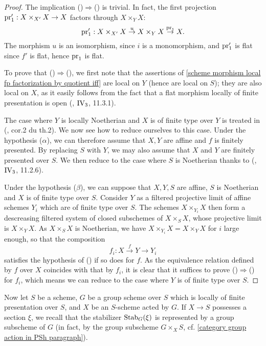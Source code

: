 \begin{proof}
The implication ()$\Rightarrow$() is trivial. In fact, the first projection $\mathrm{pr}_1':X\times_{X'}X\to X$ factors through $X\times_YX$:
\[\mathrm{pr}_1':X\times_{X'}X\stackrel{u}{\to} X\times_YX\stackrel{\mathrm{pr}_1}{\to} X.\]
The morphism $u$ is an isomorphism, since $i$ is a monomorphism, and $\mathrm{pr}_1'$ is flat since $f'$ is flat, hence $\mathrm{pr}_1$ is flat.\par
To prove that ()$\Rightarrow$(), we first note that the assertions of \cref{scheme morphism local fp factorization by quotient iff} are local on $Y$ (hence are local on $S$); they are also local on $X$, as it easily follows from the fact that a flat morphism locally of finite presentation is open (\cite{EGA4}, $\text{\Rmnum{4}}_3$, 11.3.1).\par
The case where $Y$ is locally Noetherian and $X$ is of finite type over $Y$ is treated in (\cite{Murre1964}, cor.2 du th.2). We now see how to reduce ourselves to this case. Under the hypothesis ($\alpha$), we can therefore assume that $X,Y$ are affine and $f$ is finitely presented. By replacing $S$ with $Y$, we may also assume that $X$ and $Y$ are finitely presented over $S$. We then reduce to the case where $S$ is Noetherian thanks to (\cite{EGA4}, $\text{\Rmnum{4}}_3$, 11.2.6).\par
Under the hypothesis ($\beta$), we can suppose that $X,Y,S$ are affine, $S$ is Noetherian and $X$ is of finite type over $S$. Consider $Y$ as a filtered projective limit of affine schemes $Y_i$ which are of finite type over $S$. The schemes $X\times_{Y_i}X$ then form a descreasing filtered system of closed subschemes of $X\times_SX$, whose projective limit is $X\times_YX$. As $X\times_SX$ is Noetherian, we have $X\times_{Y_i}X=X\times_YX$ for $i$ large enough, so that the composition
\[f_i:X\stackrel{f}{\to} Y\to Y_i\]
satisfies the hypothesis of () if so does for $f$. As the equivalence relation defined by $f$ over $X$ coincides with that by $f_i$, it is clear that it suffices to prove ()$\Rightarrow$() for $f_i$, which means we can reduce to the case where $Y$ is of finite type over $S$. 
\end{proof}

Now let $S$ be a scheme, $G$ be a group scheme over $S$ which is locally of finite presentation over $S$, and $X$ be an $S$-scheme acted by $G$. If $X\to S$ possesses a section $\xi$, we recall that the stabilizer $\mathrm{Stab}_G(\xi)$ is represented by a group subscheme of $G$ (in fact, by the group subscheme $G\times_XS$, cf. \ref{category group action in PSh paragraph}).

